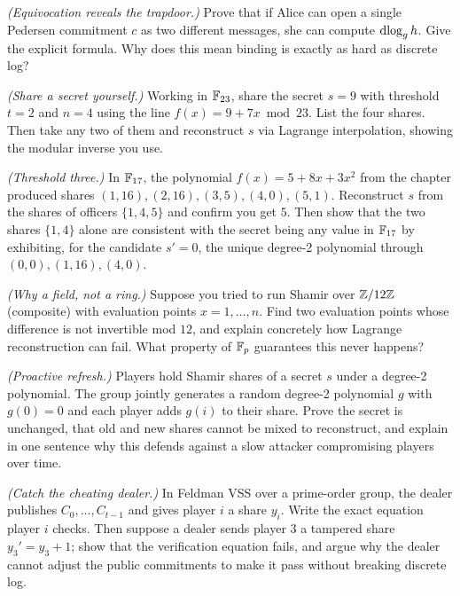 \begin{exercise}
\emph{(Equivocation reveals the trapdoor.)} Prove that if Alice can open a single Pedersen commitment $c$ as two different messages, she can compute $\operatorname{dlog}_g h$. Give the explicit formula. Why does this mean binding is exactly as hard as discrete log?
\end{exercise}

\begin{exercise}
\emph{(Share a secret yourself.)} Working in $\mathbb{F}_{23}$, share the secret $s = 9$ with threshold $t = 2$ and $n = 4$ using the line $f(x) = 9 + 7x \bmod 23$. List the four shares. Then take any two of them and reconstruct $s$ via Lagrange interpolation, showing the modular inverse you use.
\end{exercise}

\begin{exercise}
\emph{(Threshold three.)} In $\mathbb{F}_{17}$, the polynomial $f(x) = 5 + 8x + 3x^2$ from the chapter produced shares $(1,16),(2,16),(3,5),(4,0),(5,1)$. Reconstruct $s$ from the shares of officers $\{1,4,5\}$ and confirm you get $5$. Then show that the two shares $\{1,4\}$ alone are consistent with the secret being any value in $\mathbb{F}_{17}$ by exhibiting, for the candidate $s' = 0$, the unique degree-2 polynomial through $(0,0),(1,16),(4,0)$.
\end{exercise}

\begin{exercise}
\emph{(Why a field, not a ring.)} Suppose you tried to run Shamir over $\mathbb{Z}/12\mathbb{Z}$ (composite) with evaluation points $x = 1,\dots,n$. Find two evaluation points whose difference is not invertible mod $12$, and explain concretely how Lagrange reconstruction can fail. What property of $\mathbb{F}_p$ guarantees this never happens?
\end{exercise}

\begin{exercise}
\emph{(Proactive refresh.)} Players hold Shamir shares of a secret $s$ under a degree-2 polynomial. The group jointly generates a random degree-2 polynomial $g$ with $g(0) = 0$ and each player adds $g(i)$ to their share. Prove the secret is unchanged, that old and new shares cannot be mixed to reconstruct, and explain in one sentence why this defends against a slow attacker compromising players over time.
\end{exercise}

\begin{exercise}
\emph{(Catch the cheating dealer.)} In Feldman VSS over a prime-order group, the dealer publishes $C_0,\dots,C_{t-1}$ and gives player $i$ a share $y_i$. Write the exact equation player $i$ checks. Then suppose a dealer sends player 3 a tampered share $y_3' = y_3 + 1$; show that the verification equation fails, and argue why the dealer cannot adjust the public commitments to make it pass without breaking discrete log.
\end{exercise}

